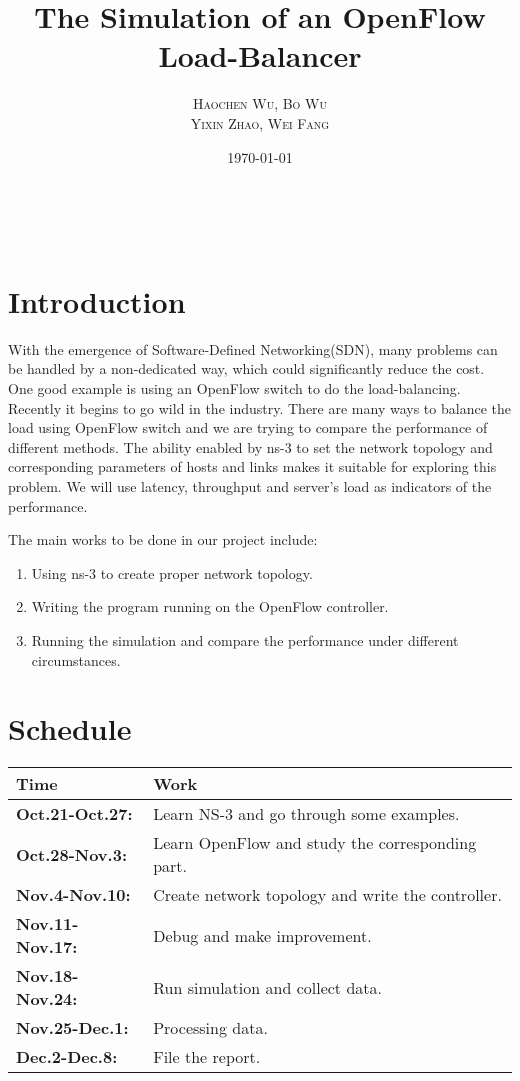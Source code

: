 \documentclass[12pt]{article} %
\title{\textbf{The Simulation of an OpenFlow Load-Balancer}} %
\author{\textsc{Haochen Wu, Bo Wu\\Yixin Zhao, Wei Fang}} %
\date{\today} %
\makeatletter
\renewcommand{\maketitle}{ %
\begin{center}
{\LARGE\@title} %
\end{center}

\begin{flushright} %
\vspace{40pt} %

{\large\@author} %
\vspace{10pt}
\\\@date %

\vspace{40pt} %
\end{flushright}
}
\makeatother
\begin{document}
\maketitle %

\section*{Introduction}
With the emergence of Software-Defined Networking(SDN), many problems can be handled by a non-dedicated way, which could significantly reduce the cost.
One good example is using an OpenFlow switch to do the load-balancing. Recently it begins to go wild in the industry.
There are many ways to balance the load using OpenFlow switch and we are trying to compare the performance of different methods.
The ability enabled by ns-3 to set the network topology and corresponding parameters of hosts and links makes it suitable for exploring this problem.
We will use latency, throughput and server's load as indicators of the performance.

The main works to be done in our project include:

\begin{enumerate}
\item Using ns-3 to create proper network topology.
\item Writing the program running on the OpenFlow controller.
\item Running the simulation and compare the performance under different circumstances.
\end{enumerate}

\section*{Schedule}

\begin{tabular}{ll}
\hline
\textbf{Time} & \textbf{Work}\\
\hline
\textbf{Oct.21-Oct.27:} & Learn NS-3 and go through some examples. \\
\textbf{Oct.28-Nov.3:} & Learn OpenFlow and study the corresponding part.\\
\textbf{Nov.4-Nov.10:} & Create network topology and write the controller.\\
\textbf{Nov.11-Nov.17:} & Debug and make improvement.\\
\textbf{Nov.18-Nov.24:} & Run simulation and collect data.\\
\textbf{Nov.25-Dec.1:} & Processing data.\\
\textbf{Dec.2-Dec.8:} & File the report.\\
\hline
\end{tabular}
\end{document}
